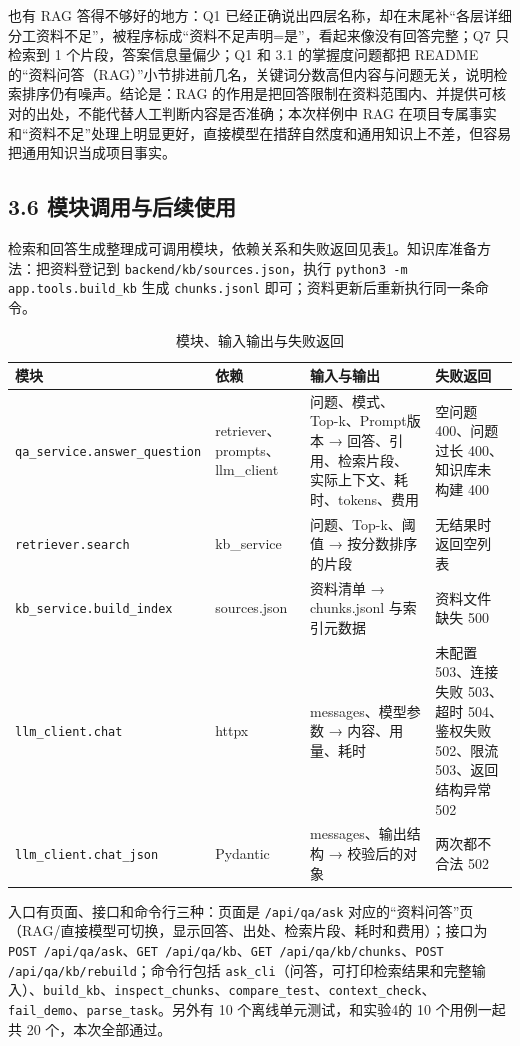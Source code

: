 \documentclass[UTF8,12pt,a4paper]{ctexart}
\begin{document}
也有 RAG 答得不够好的地方：Q1 已经正确说出四层名称，却在末尾补“各层详细分工资料不足”，被程序标成“资料不足声明=是”，看起来像没有回答完整；Q7 只检索到 1 个片段，答案信息量偏少；Q1 和 3.1 的掌握度问题都把 README 的“资料问答（RAG）”小节排进前几名，关键词分数高但内容与问题无关，说明检索排序仍有噪声。结论是：RAG 的作用是把回答限制在资料范围内、并提供可核对的出处，不能代替人工判断内容是否准确；本次样例中 RAG 在项目专属事实和“资料不足”处理上明显更好，直接模型在措辞自然度和通用知识上不差，但容易把通用知识当成项目事实。

\subsection*{3.6 模块调用与后续使用}

检索和回答生成整理成可调用模块，依赖关系和失败返回见表\ref{tab:modules}。知识库准备方法：把资料登记到 \texttt{backend/kb/sources.json}，执行 \texttt{python3 -m app.tools.build\_kb} 生成 \texttt{chunks.jsonl} 即可；资料更新后重新执行同一条命令。

\begin{table}[H]
\centering
\caption{模块、输入输出与失败返回}
\label{tab:modules}
\scriptsize
\begin{tabularx}{\textwidth}{p{4.3cm}p{2.7cm}X p{2.9cm}}
\toprule
模块 & 依赖 & 输入与输出 & 失败返回 \\
\midrule
\texttt{qa\_service.answer\_question} & retriever、prompts、llm\_client & 问题、模式、Top-k、Prompt版本 → 回答、引用、检索片段、实际上下文、耗时、tokens、费用 & 空问题 400、问题过长 400、知识库未构建 400 \\
\texttt{retriever.search} & kb\_service & 问题、Top-k、阈值 → 按分数排序的片段 & 无结果时返回空列表 \\
\texttt{kb\_service.build\_index} & sources.json & 资料清单 → chunks.jsonl 与索引元数据 & 资料文件缺失 500 \\
\texttt{llm\_client.chat} & httpx & messages、模型参数 → 内容、用量、耗时 & 未配置 503、连接失败 503、超时 504、鉴权失败 502、限流 503、返回结构异常 502 \\
\texttt{llm\_client.chat\_json} & Pydantic & messages、输出结构 → 校验后的对象 & 两次都不合法 502 \\
\bottomrule
\end{tabularx}
\end{table}

入口有页面、接口和命令行三种：页面是 \texttt{/api/qa/ask} 对应的“资料问答”页（RAG/直接模型可切换，显示回答、出处、检索片段、耗时和费用）；接口为 \texttt{POST /api/qa/ask}、\texttt{GET /api/qa/kb}、\texttt{GET /api/qa/kb/chunks}、\texttt{POST /api/qa/kb/rebuild}；命令行包括 \texttt{ask\_cli}（问答，可打印检索结果和完整输入）、\texttt{build\_kb}、\texttt{inspect\_chunks}、\texttt{compare\_test}、\texttt{context\_check}、\texttt{fail\_demo}、\texttt{parse\_task}。另外有 10 个离线单元测试，和实验4的 10 个用例一起共 20 个，本次全部通过。
\end{document}
